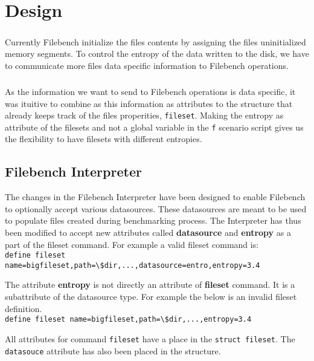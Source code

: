\chapter{Design}\label{chap:des}

\paragraph{}
Currently Filebench initialize the files contents by assigning the files uninitialized memory segments.
 To control the entropy of the data written to the disk, we have to communicate more files data specific information to Filebench operations.

\paragraph{}
As the information we want to send to Filebench operations is data specific, it was ituitive to combine as this information as attributes to the structure that already keeps track of the files properities, \verb+fileset+.
Making the entropy as attribute of the filesets and not a global variable in the \verb+f+ scenario script gives us the flexibility to have filesets with different entropies.




\section{Filebench Interpreter}
The changes in the Filebench Interpreter have been designed to enable Filebench to optionally accept various datasources. These datasources are meant to be used to populate files created during benchmarking process. The Interpreter has thus been modified to accept new attributes called \textbf{datasource} and \textbf{entropy} as a part of the fileset command. For example a valid fileset command is:\\
\indent \verb+define fileset name=bigfileset,path=\$dir,...,datasource=entro,entropy=3.4+

The attribute \textbf{entropy} is not directly an attribute of \textbf{fileset} command. It is a subattribute of the datasource type. For example the below is an invalid fileset definition.\\
\indent \verb+define fileset name=bigfileset,path=\$dir,...,entropy=3.4+

\noindent All attributes for command \verb+fileset+ have a place in the \verb+struct fileset+. The \verb+datasouce+ attribute has also been placed in the structure.

